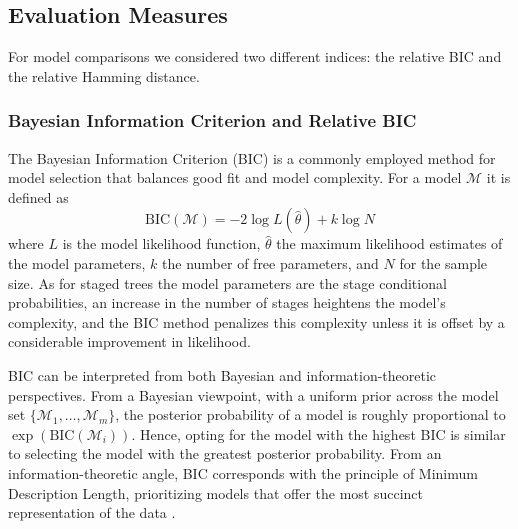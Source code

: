 \documentclass[preprint,12pt]{elsarticle}
\newcommand{\blue}{\color{blue}}
\newcommand{\red}{\color{red}}
\begin{document}

\subsection{Evaluation Measures}
For model comparisons we considered two different indices: the relative BIC and the relative Hamming distance. 

\subsubsection{Bayesian Information Criterion and Relative BIC}
The Bayesian Information Criterion (BIC) is a commonly employed method for model selection that balances good fit and model complexity. For a model $\mathcal M$ it is defined as 
\begin{equation*}  
\text{BIC}(\mathcal M) = -2 \log L(\hat{\theta}) + k \log N 
\end{equation*}
where  $L$ is the model likelihood function, \( \hat{\theta} \) the maximum likelihood estimates of the  model parameters, \( k \) the number of free parameters, and \( N \) for the sample size.
As for staged trees the model parameters are the stage conditional probabilities, an increase in the number of stages heightens the model’s complexity, and the BIC method penalizes this complexity unless it is offset by a considerable improvement in likelihood. 

BIC can be interpreted from both Bayesian and information-theoretic perspectives. From a Bayesian viewpoint, with a uniform prior across the model set \( \{ \mathcal{M}_1, \dots, \mathcal{M}_m \} \), the posterior probability of a model is roughly proportional to \( \exp(\text{BIC}(\mathcal{M}_i)) \). Hence, opting for the model with the highest BIC is similar to selecting the model with the greatest posterior probability. From an information-theoretic angle, BIC corresponds with the principle of Minimum Description Length, prioritizing models that offer the most succinct representation of the data \cite{schwarz1978estimating, wasserman2013}.
\end{document}
